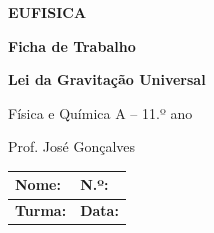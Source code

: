 \documentclass[11pt,a4paper]{article}
\begin{document}
	
	
	\begin{center}
		
		{\Huge\bfseries\textcolor{eufblue}{EUFISICA}}
		
		\vspace{1mm}
		
		{\Large\bfseries Ficha de Trabalho}
		
		\vspace{1mm}
		
		{\LARGE\bfseries Lei da Gravitação Universal}
		
		\vspace{2mm}
		
		{\large Física e Química A -- 11.º ano}
		
		\vspace{2mm}
		
		{\small Prof. José Gonçalves}
		
	\end{center}
	
	\vspace{2mm}
	
	\begin{tabularx}{\textwidth}{|X|X|}
		\hline
		\textbf{Nome:} & \textbf{N.º:} \\[0.45cm]
		\hline
		\textbf{Turma:} & \textbf{Data:} \\[0.45cm]
		\hline
	\end{tabularx}
	
	\vspace{4mm}
	
	
\end{document}
